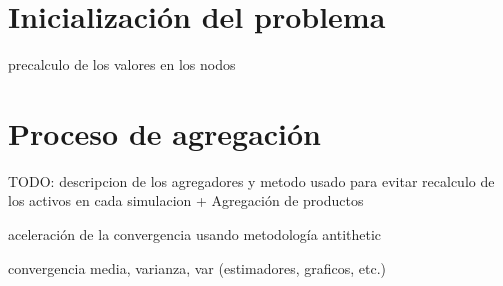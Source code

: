 
\section{Inicializaci\'on del problema}


precalculo de los valores en los nodos


\section{Proceso de agregaci\'on}

TODO: descripcion de los agregadores y metodo usado para evitar recalculo 
de los activos en cada simulacion + Agregaci\'on de productos

aceleraci\'on de la convergencia usando metodolog\'ia antithetic

convergencia media, varianza, var (estimadores, graficos, etc.)

